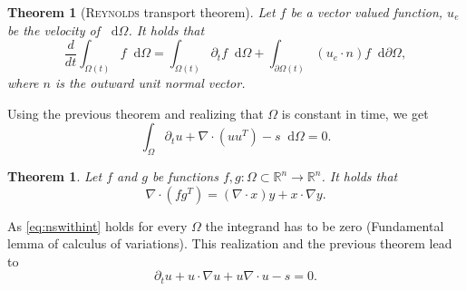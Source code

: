 \documentclass[12pt,a4paper,twoside, open=right]{scrreprt}
\theoremstyle{definition}
\theoremstyle{plain}
\newtheorem{sa}[auf]{Theorem}
\newcommand{\rr}{\mathbb{R}}
\newcommand{\D}{\mathop{}\!\mathrm{d}}
\begin{document}
\begin{sa}[\textsc{Reynolds} transport theorem]
    Let $f$ be a vector valued function, $u_e$ be the velocity of $\D\Omega$. It holds that
    \begin{equation}
        \frac{d}{dt}\int_{\Omega(t)}f\D \Omega =\int_{\Omega(t)}\partial_t f\D \Omega+\int_{\partial\Omega(t)}(u_e\cdot n)f\D \partial \Omega,
    \end{equation}
    where $n$ is the outward unit normal vector.
\end{sa}
Using the previous theorem and realizing that $\Omega$ is constant in time, we get
\begin{equation}\label{eq:nswithint}
    \int_\Omega \partial_t u +\nabla\cdot(uu^T)-s\D\Omega =0.
\end{equation}
\begin{sa}
    Let $f$ and $g$ be functions $f,g\colon\Omega\subset\rr^n\to\rr^n$. It holds that
    \begin{equation}
    \nabla\cdot(fg^T)=(\nabla\cdot x)y+x\cdot\nabla y.
    \end{equation}
\end{sa}
As \eqref{eq:nswithint} holds for every $\Omega$ the integrand has to be zero (Fundamental lemma of calculus of variations). This realization and the previous theorem lead to 
\begin{equation}
    \partial_t u +u\cdot\nabla u+u\nabla\cdot u - s = 0.
\end{equation}
\end{document}
